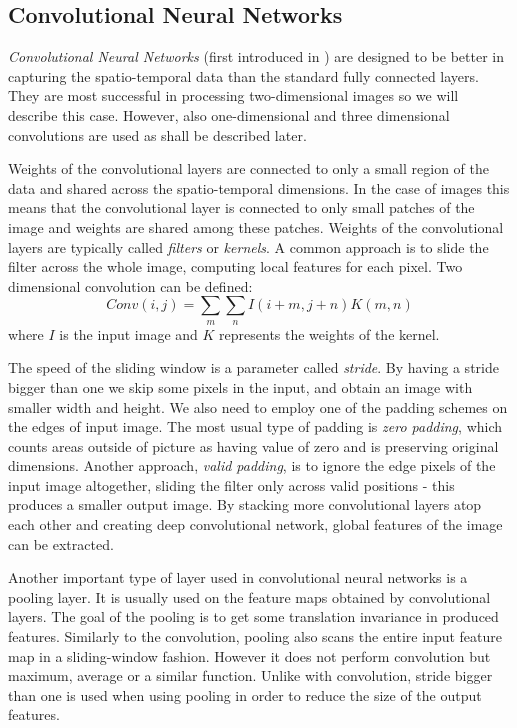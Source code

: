 

\subsection{Convolutional Neural Networks}
\textit{Convolutional Neural Networks} (first introduced in \cite{lecun_backpropagation_1989}) are designed to be better in capturing the spatio-temporal data than the standard fully connected layers. They are most successful in processing two-dimensional images so we will describe this case. However, also one-dimensional and three dimensional convolutions are used as shall be described later.  \par
Weights of the convolutional layers are connected to only a small region of the data and shared across the spatio-temporal dimensions. In the case of images this means that the convolutional layer is connected to only small patches of the image and weights are shared among these patches. Weights of the convolutional layers are typically called \textit{filters} or \textit{kernels}. A common approach is to slide the filter across the whole image,  computing local features for each pixel.
Two dimensional convolution can be defined:
$$Conv(i,j) = \sum_m {\sum_n {I(i+m,j+n)K(m,n)}}$$ where $I$ is the input image and $K$ represents the weights of the kernel.\par
The speed of the sliding window is a parameter called \textit{stride}. By having a stride bigger than one we skip some pixels in the input, and obtain an image with smaller width and height. We also need to employ one of the padding schemes on the edges of input image. The most usual type of padding is \textit{zero padding}, which counts areas outside of picture as having value of zero and is preserving original dimensions. Another approach, \textit{valid padding}, is to ignore the edge pixels of the input image altogether, sliding the filter only across valid positions - this produces a smaller output image.
By stacking more convolutional layers atop each other and creating deep convolutional network,  global features of the image can be extracted. 
\par
Another important type of layer used in convolutional neural networks is a pooling layer. It is usually used on the feature maps obtained by convolutional layers. The goal of the pooling is to get some translation invariance in produced features. Similarly to the convolution, pooling also scans the entire input feature map in a sliding-window fashion. However it does not perform convolution but maximum, average or a similar function. Unlike with convolution, stride bigger than one is used when using pooling in order to reduce the size of the output features.
